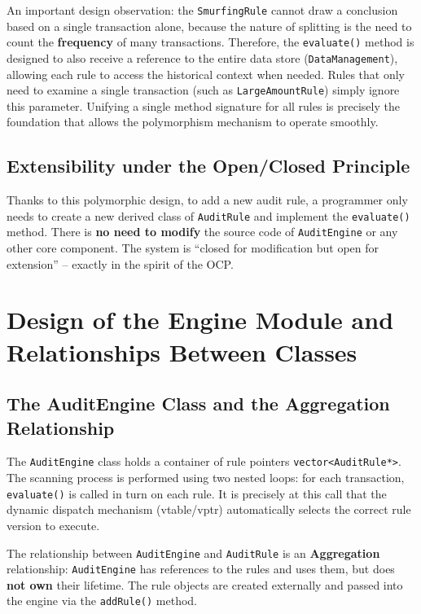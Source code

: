     \begin{nx}
    An important design observation: the \texttt{SmurfingRule} cannot draw a conclusion based on a single transaction alone, because the nature of splitting is the need to count the \textbf{frequency} of many transactions. Therefore, the \texttt{evaluate()} method is designed to also receive a reference to the entire data store (\texttt{DataManagement}), allowing each rule to access the historical context when needed. Rules that only need to examine a single transaction (such as \texttt{LargeAmountRule}) simply ignore this parameter. Unifying a single method signature for all rules is precisely the foundation that allows the polymorphism mechanism to operate smoothly.
    \end{nx}

    \subsection{Extensibility under the Open/Closed Principle}
    Thanks to this polymorphic design, to add a new audit rule, a programmer only needs to create a new derived class of \texttt{AuditRule} and implement the \texttt{evaluate()} method. There is \textbf{no need to modify} the source code of \texttt{AuditEngine} or any other core component. The system is ``closed for modification but open for extension'' -- exactly in the spirit of the OCP.

\section{Design of the Engine Module and Relationships Between Classes}
    \subsection{The AuditEngine Class and the Aggregation Relationship}
    The \texttt{AuditEngine} class holds a container of rule pointers \texttt{vector<AuditRule*>}. The scanning process is performed using two nested loops: for each transaction, \texttt{evaluate()} is called in turn on each rule. It is precisely at this call that the dynamic dispatch mechanism (vtable/vptr) automatically selects the correct rule version to execute.

    The relationship between \texttt{AuditEngine} and \texttt{AuditRule} is an \textbf{Aggregation} relationship: \texttt{AuditEngine} has references to the rules and uses them, but does \textbf{not own} their lifetime. The rule objects are created externally and passed into the engine via the \texttt{addRule()} method.

